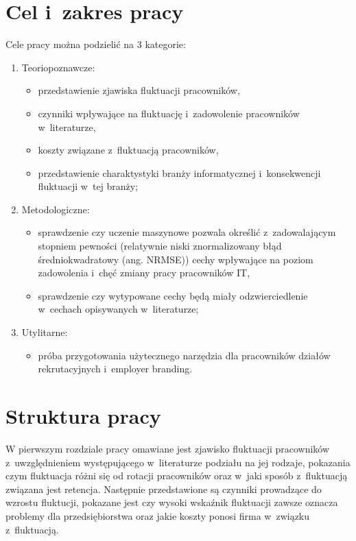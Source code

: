 \section*{Cel i~zakres pracy}\label{sec:admission:thesis-goal}

Cele pracy można podzielić na 3 kategorie:
\begin{enumerate}
    \item Teoriopoznawcze:
    \begin{itemize}
        \item przedstawienie zjawiska fluktuacji pracowników,
        \item czynniki wpływające na fluktuację i~zadowolenie pracowników w~literaturze,
        \item koszty związane z~fluktuacją pracowników,
        \item przedstawienie charaktystyki branży informatycznej i~konsekwencji fluktuacji w~tej branży;
    \end{itemize}
    \item Metodologiczne:
    \begin{itemize}
        \item sprawdzenie czy uczenie maszynowe pozwala określić z~zadowalającym stopniem pewności (relatywnie niski znormalizowany błąd średniokwadratowy (ang. NRMSE)) cechy wpływające na poziom zadowolenia i~chęć zmiany pracy pracowników IT,
        \item sprawdzenie czy wytypowane cechy będą miały odzwierciedlenie w~cechach opisywanych w~literaturze;
    \end{itemize}
    \pagebreak %
    \item Utylitarne:
    \begin{itemize}
        \item próba przygotowania użytecznego narzędzia dla pracowników działów rekrutacyjnych i~employer branding.
    \end{itemize}
\end{enumerate}

\section*{Struktura pracy}\label{sec:admission:thesis-structure}

W pierwszym rozdziale pracy omawiane jest zjawisko fluktuacji pracowników z~uwzględnieniem występującego w~literaturze podziału na jej rodzaje,
pokazania czym fluktuacja różni się od rotacji pracowników oraz w~jaki sposób z~fluktuacją związana jest retencja.
Następnie przedstawione są czynniki prowadzące do wzrostu fluktucji, pokazane jest czy wysoki wskaźnik fluktuacji zawsze oznacza problemy dla przedsiębiorstwa
oraz jakie koszty ponosi firma w~związku z~fluktuacją.

